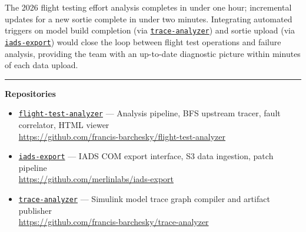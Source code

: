 \documentclass[11pt, letterpaper]{article}
\newcommand{\repoFTA}{\href{https://github.com/francis-barchesky/flight-test-analyzer}{\texttt{flight-test-analyzer}}}
\newcommand{\repoIADS}{\href{https://github.com/merlinlabs/iads-export}{\texttt{iads-export}}}
\newcommand{\repoTrace}{\href{https://github.com/francis-barchesky/trace-analyzer}{\texttt{trace-analyzer}}}
\begin{document}
The 2026 flight testing effort analysis completes in under one hour; incremental
updates for a new sortie complete in under two minutes. Integrating automated
triggers on model build completion (via \repoTrace{}) and sortie upload (via
\repoIADS{}) would close the loop between flight test operations and failure
analysis, providing the team with an up-to-date diagnostic picture within
minutes of each data upload.


\vspace{1em}
\noindent\rule{\textwidth}{0.4pt}
\vspace{0.3em}

\noindent\textbf{Repositories}
\begin{itemize}[itemsep=3pt,topsep=4pt]
  \item \repoFTA{} --- Analysis pipeline, BFS upstream tracer, fault correlator,
    HTML viewer \\
    {\small\url{https://github.com/francis-barchesky/flight-test-analyzer}}
  \item \repoIADS{} --- IADS COM export interface, S3 data ingestion, patch pipeline \\
    {\small\url{https://github.com/merlinlabs/iads-export}}
  \item \repoTrace{} --- Simulink model trace graph compiler and artifact publisher \\
    {\small\url{https://github.com/francis-barchesky/trace-analyzer}}
\end{itemize}

\end{document}
